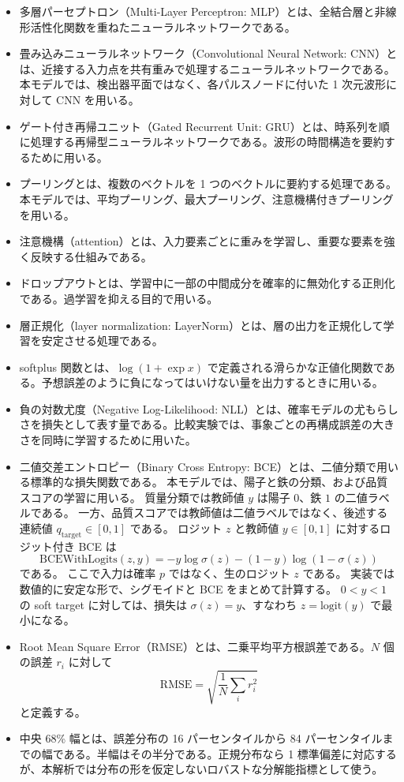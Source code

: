 \documentclass[lualatex,paper=a4,fontsize=9pt]{jlreq}
\begin{document}
\begin{itemize}
  質量分類では、$z$ が大きいほど鉄らしく、$z=0$ が $p(\mathrm{Fe})=0.5$ に対応する。
  \item 多層パーセプトロン（Multi-Layer Perceptron: MLP）とは、全結合層と非線形活性化関数を重ねたニューラルネットワークである。
  \item 畳み込みニューラルネットワーク（Convolutional Neural Network: CNN）とは、近接する入力点を共有重みで処理するニューラルネットワークである。本モデルでは、検出器平面ではなく、各パルスノードに付いた 1 次元波形に対して CNN を用いる。
  \item ゲート付き再帰ユニット（Gated Recurrent Unit: GRU）とは、時系列を順に処理する再帰型ニューラルネットワークである。波形の時間構造を要約するために用いる。
  \item プーリングとは、複数のベクトルを 1 つのベクトルに要約する処理である。本モデルでは、平均プーリング、最大プーリング、注意機構付きプーリングを用いる。
  \item 注意機構（attention）とは、入力要素ごとに重みを学習し、重要な要素を強く反映する仕組みである。
  \item ドロップアウトとは、学習中に一部の中間成分を確率的に無効化する正則化である。過学習を抑える目的で用いる。
  \item 層正規化（layer normalization: LayerNorm）とは、層の出力を正規化して学習を安定させる処理である。
  \item softplus 関数とは、$\log(1+\exp x)$ で定義される滑らかな正値化関数である。予想誤差のように負になってはいけない量を出力するときに用いる。
  \item 負の対数尤度（Negative Log-Likelihood: NLL）とは、確率モデルの尤もらしさを損失として表す量である。比較実験では、事象ごとの再構成誤差の大きさを同時に学習するために用いた。
  \item 二値交差エントロピー（Binary Cross Entropy: BCE）とは、二値分類で用いる標準的な損失関数である。
  本モデルでは、陽子と鉄の分類、および品質スコアの学習に用いる。
  質量分類では教師値 $y$ は陽子 $0$、鉄 $1$ の二値ラベルである。
  一方、品質スコアでは教師値は二値ラベルではなく、後述する連続値 $q_{\mathrm{target}}\in[0,1]$ である。
  ロジット $z$ と教師値 $y\in[0,1]$ に対するロジット付き BCE は
  \[
    \mathrm{BCEWithLogits}(z,y)
    =
    -y\log\sigma(z)-(1-y)\log(1-\sigma(z))
  \]
  である。
  ここで入力は確率 $p$ ではなく、生のロジット $z$ である。
  実装では数値的に安定な形で、シグモイドと BCE をまとめて計算する。
  $0<y<1$ の soft target に対しては、損失は $\sigma(z)=y$、すなわち $z=\mathrm{logit}(y)$ で最小になる。
  \item Root Mean Square Error（RMSE）とは、二乗平均平方根誤差である。$N$ 個の誤差 $r_i$ に対して
  \[
    \mathrm{RMSE}=\sqrt{\frac{1}{N}\sum_i r_i^2}
  \]
  と定義する。
  \item 中央 68\% 幅とは、誤差分布の 16 パーセンタイルから 84 パーセンタイルまでの幅である。半幅はその半分である。正規分布なら 1 標準偏差に対応するが、本解析では分布の形を仮定しないロバストな分解能指標として使う。
\end{itemize}
\end{document}
